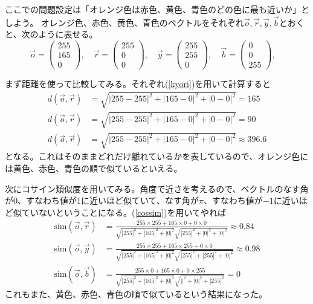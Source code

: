 \documentclass[10pt]{jsarticle}
\numberwithin{equation}{section}%
\begin{document}
ここでの問題設定は「オレンジ色は赤色、黄色、青色のどの色に最も近いか」としよう。
オレンジ色、赤色、黄色、青色のベクトルをそれぞれ$\vec{o},\vec{r},\vec{y},\vec{b}$とおくと、次のように表せる。
\begin{equation}
  \vec{o}=\left( \begin{matrix}
    255\\
    165\\
    0
  \end{matrix}\right),\quad 
  \vec{r}=\left( \begin{matrix}
    255\\
    0\\
    0
  \end{matrix}\right),\quad 
  \vec{y}=\left( \begin{matrix}
    255\\
    255\\
    0
  \end{matrix}\right),\quad 
  \vec{b}=\left( \begin{matrix}
    0\\
    0\\
    255
  \end{matrix}\right),\quad 
\end{equation}


まず距離を使って比較してみる。それぞれ(\ref{kyori})を用いて計算すると
\begin{align}
  d(\vec{o},\vec{r})&=\sqrt{|255-255|^{2}+|165-0|^{2}+|0-0|^{2}}=165\\
  d(\vec{o},\vec{r})&=\sqrt{|255-255|^{2}+|165-0|^{2}+|0-0|^{2}}=90\\
  d(\vec{o},\vec{r})&=\sqrt{|255-255|^{2}+|165-0|^{2}+|0-0|^{2}}\approx 396.6
\end{align}
となる。これはそのままどれだけ離れているかを表しているので、オレンジ色には黄色、赤色、青色の順で似ているといえる。


次にコサイン類似度を用いてみる。角度で近さを考えるので、ベクトルのなす角が0、すなわち値が1に近いほど似ていて、なす角が$\pi$、すなわち値が$-1$に近いほど似ていないということになる。(\ref{cossim})を用いてやれば
\begin{align}
  \mathrm{sim}(\vec{o},\vec{r})&=\frac{255\times 255 +165\times 0 +0\times0}{\sqrt{|255|^{2}+|165|^{2}+|0|^2}\sqrt{|255|^{2}+|0|^{2}+|0|^2}}\approx 0.84\\
  \mathrm{sim}(\vec{o},\vec{y})&=\frac{255\times 255 +165\times 255 +0\times0}{\sqrt{|255|^{2}+|165|^{2}+|0|^2}\sqrt{|255|^{2}+|255|^{2}+|0|^2}}\approx 0.98\\
  \mathrm{sim}(\vec{o},\vec{b})&=\frac{255\times 0 +165\times 0 +0\times255}{\sqrt{|255|^{2}+|165|^{2}+|0|^2}\sqrt{||^{2}+|0|^{2}+|255|^2}}= 0
\end{align}
これもまた、黄色、赤色、青色の順で似ているという結果になった。
\end{document}
